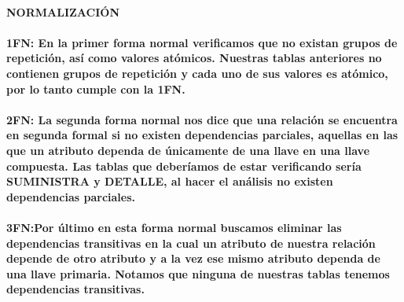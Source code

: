 \documentclass{article}
\begin{document}
	 \paragraph{NORMALIZACIÓN }

	 \paragraph{1FN: En la primer forma normal verificamos que no existan grupos de repetición, así como valores atómicos. Nuestras tablas anteriores no contienen grupos de repetición y cada uno de sus valores es atómico, por lo tanto cumple con la 1FN.\\\\
	 2FN: La segunda forma normal nos dice que una relación se encuentra en segunda formal si no existen dependencias parciales, aquellas en las que un atributo dependa de únicamente de una llave en una llave compuesta. Las tablas que deberíamos de estar verificando sería SUMINISTRA y DETALLE, al hacer el análisis no existen dependencias parciales.\\\\
	 3FN:Por último en esta forma normal buscamos eliminar las dependencias transitivas en la cual un atributo de nuestra relación depende de otro atributo y a la vez ese mismo atributo dependa de una llave primaria. Notamos que ninguna de nuestras tablas tenemos dependencias transitivas.}
\end{document}
